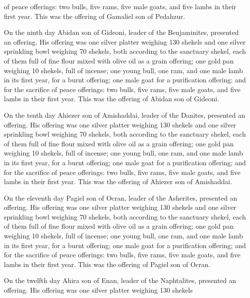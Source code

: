 {of peace offerings: two
bulls,
five
rams,
five
male goats,
and five
lambs
in their first year.
This
was the offering
of Gamaliel
son
of Pedahzur.
\par }{\PP {}On the ninth
day
Abidan
son
of Gideoni,
leader
of the Benjaminites, presented an offering.
His offering
was one
silver
platter
weighing 130
shekels
and one
silver
sprinkling bowl
weighing 70
shekels,
both according to the sanctuary
shekel,
each of them
full
of fine flour
mixed
with olive oil
as a grain offering;
one
gold
pan
weighing
10
shekels, full
of incense;
one
young
bull,
one ram,
and one
male lamb
in its first
year,
for a burnt offering;
one
male
goat
for a purification offering;
and for the sacrifice
of peace offerings: two
bulls,
five
rams,
five
male goats,
and five
lambs
in their first year.
This
was the offering
of Abidan
son
of Gideoni.
\par }{\PP {}On the tenth
day
Ahiezer
son
of Amishaddai,
leader
of the Danites, presented an offering.
His offering
was one
silver
platter
weighing 130
shekels
and one
silver
sprinkling bowl
weighing 70
shekels,
both according to the sanctuary
shekel,
each of them
full
of fine flour
mixed
with olive oil
as a grain offering;
one
gold
pan
weighing
10
shekels, full
of incense;
one
young
bull,
one ram,
and one
male lamb
in its first
year,
for a burnt offering;
one
male
goat
for a purification offering;
and for the sacrifice
of peace offerings: two
bulls,
five
rams,
five
male goats,
and five
lambs
in their first year.
This
was the offering
of Ahiezer
son
of Amishaddai.
\par }{\PP {}On
the eleventh
day
Pagiel
son
of Ocran,
leader
of the Asherites, presented an offering.
His offering
was one
silver
platter
weighing 130
shekels
and one
silver
sprinkling bowl
weighing 70
shekels,
both according to the sanctuary
shekel,
each of them
full
of fine flour
mixed
with olive oil
as a grain offering;
one
gold
pan
weighing
10
shekels, full
of incense;
one
young
bull,
one ram,
and one
male lamb
in its first
year,
for a burnt offering;
one
male
goat
for a purification offering;
and for the sacrifice
of peace offerings: two
bulls,
five
rams,
five
male goats,
and five
lambs
in their first year.
This
was the offering
of Pagiel
son
of Ocran.
\par }{\PP {}On
the twelfth
day
Ahira
son
of Enan,
leader
of the Naphtalites, presented an offering.
His offering
was one
silver
platter
weighing 130
shekels
}
